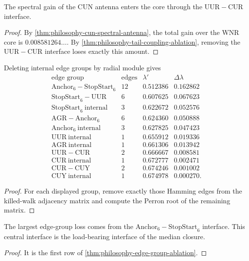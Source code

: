 \begin{corollary}
\label{cor:philosophy-antenna-input-port}
The spectral gain of the $\mathrm{CUN}$ antenna enters the core through
the $\mathrm{UUR}-\mathrm{CUR}$ interface.
\end{corollary}
\begin{proof}
By \autoref{thm:philosophy-cun-spectral-antenna}, the total gain over
the $\mathrm{WNR}$ core is $0.008581264\ldots$. By
\autoref{thm:philosophy-tail-coupling-ablation}, removing the
$\mathrm{UUR}-\mathrm{CUR}$ interface loses exactly this amount.
\end{proof}

\begin{theorem}
\label{thm:philosophy-edge-group-ablation}
Deleting internal edge groups by radial module gives
$$
\begin{array}{c|r|r|r}
  \text{edge group} & \text{edges} & \lambda' & \Delta\lambda\\
  \hline
  \mathrm{Anchor}_{6}-\mathrm{StopStart}_{6} & 12 & 0.512386 & 0.162862\\
  \mathrm{StopStart}_{6}-\mathrm{UUR} & 6 & 0.607625 & 0.067623\\
  \mathrm{StopStart}_{6}\ \text{internal} & 3 & 0.622672 & 0.052576\\
  \mathrm{AGR}-\mathrm{Anchor}_{6} & 6 & 0.624360 & 0.050888\\
  \mathrm{Anchor}_{6}\ \text{internal} & 3 & 0.627825 & 0.047423\\
  \mathrm{UUR}\ \text{internal} & 1 & 0.655912 & 0.019336\\
  \mathrm{AGR}\ \text{internal} & 1 & 0.661306 & 0.013942\\
  \mathrm{UUR}-\mathrm{CUR} & 2 & 0.666667 & 0.008581\\
  \mathrm{CUR}\ \text{internal} & 1 & 0.672777 & 0.002471\\
  \mathrm{CUR}-\mathrm{CUY} & 2 & 0.674246 & 0.001002\\
  \mathrm{CUY}\ \text{internal} & 1 & 0.674978 & 0.000270.
\end{array}
$$
\end{theorem}
\begin{proof}
For each displayed group, remove exactly those Hamming edges from the
killed-walk adjacency matrix and compute the Perron root of the
remaining matrix.
\end{proof}

\begin{corollary}
\label{cor:philosophy-central-load-bearing-interface}
The largest edge-group loss comes from the
$\mathrm{Anchor}_{6}-\mathrm{StopStart}_{6}$ interface. This central
interface is the load-bearing interface of the median closure.
\end{corollary}
\begin{proof}
It is the first row of \autoref{thm:philosophy-edge-group-ablation}.
\end{proof}

